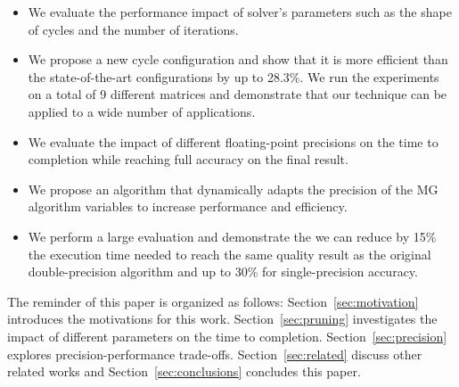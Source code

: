 \begin{itemize}

    \item We evaluate the performance impact of solver's parameters such
        as the shape of cycles and the number of iterations.

    \item We propose a new cycle configuration and show that it is more
        efficient than the state-of-the-art configurations by up to 28.3\%. We
        run the experiments on a total of 9 different matrices and demonstrate
        that our technique can be applied to a wide number of applications.


    \item We evaluate the impact of different floating-point precisions on the
        time to completion while reaching full accuracy on the final result.

    \item We propose an algorithm that dynamically adapts the precision of the
        MG algorithm variables to increase performance and efficiency.

    \item We perform a large evaluation and demonstrate the we can reduce by
        15\% the execution time needed to reach the same quality result as the
        original double-precision algorithm and up to 30\% for single-precision
        accuracy.

\end{itemize}

The reminder of this paper is organized as follows:
Section~\ref{sec:motivation} introduces the motivations for this work.
Section~\ref{sec:pruning} investigates the impact of different parameters on
the time to completion.  Section~\ref{sec:precision} explores
precision-performance trade-offs.  Section~\ref{sec:related} discuss other
related works and Section~\ref{sec:conclusions} concludes this paper.

